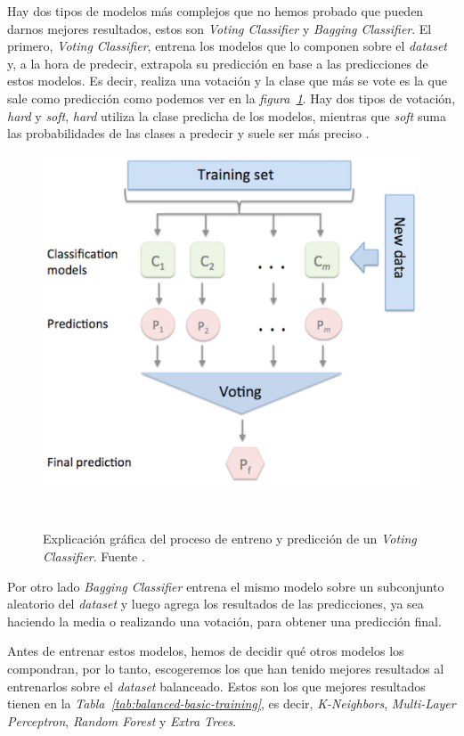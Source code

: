 Hay dos tipos de modelos más complejos que no hemos probado que pueden darnos mejores resultados, estos son \textit{Voting Classifier} y \textit{Bagging Classifier}. El primero, \textit{Voting Classifier}, entrena los modelos que lo componen sobre el \textit{dataset} y, a la hora de predecir, extrapola su predicción en base a las predicciones de estos modelos. Es decir, realiza una votación y la clase que más se vote es la que sale como predicción como podemos ver en la \textit{figura\ \ref{fig:voting-classifiers}}. Hay dos tipos de votación, \textit{hard} y \textit{soft}, \textit{hard} utiliza la clase predicha de los modelos, mientras que \textit{soft} suma las probabilidades de las clases a predecir y suele ser más preciso \cite{Ensemble96:online}. 

\begin{figure}[!h]
    \centering
    \includegraphics[width=0.7\linewidth]{media/images/majority_voting.png}
    \caption{Explicación gráfica del proceso de entreno y predicción de un \textit{Voting Classifier}. Fuente \cite{Ensemble96:online}.}\ \label{fig:voting-classifiers}
\end{figure}

Por otro lado \textit{Bagging Classifier} entrena el mismo modelo sobre un subconjunto aleatorio del \textit{dataset} y luego agrega los resultados de las predicciones, ya sea haciendo la media o realizando una votación, para obtener una predicción final.\ \cite{sklearne53:online}


Antes de entrenar estos modelos, hemos de decidir qué otros modelos los compondran, por lo tanto, escogeremos los que han tenido mejores resultados al entrenarlos sobre el \textit{dataset} balanceado. Estos son los que mejores resultados tienen en la \textit{Tabla\ \ref{tab:balanced-basic-training}}, es decir, \textit{K-Neighbors}, \textit{Multi-Layer Perceptron}, \textit{Random Forest} y \textit{Extra Trees}.

